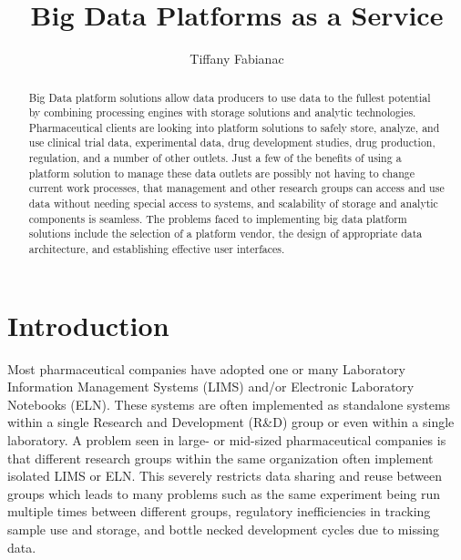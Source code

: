 \documentclass[sigconf]{acmart}
\begin{document}
\title{Big Data Platforms as a Service}


\author{Tiffany Fabianac}
\orcid{}

\renewcommand{\shortauthors}{T. Fabianac}


\begin{abstract}
Big Data platform solutions allow data producers to use data to the fullest potential by combining processing engines with storage solutions and analytic technologies. Pharmaceutical clients are looking into platform solutions to safely store, analyze, and use clinical trial data, experimental data, drug development studies, drug production, regulation, and a number of other outlets. Just a few of the benefits of using a platform solution to manage these data outlets are possibly not having to change current work processes, that management and other research groups can access and use data without needing special access to systems, and scalability of storage and analytic components is seamless. The problems faced to implementing big data platform solutions include the selection of a platform vendor, the design of appropriate data architecture, and establishing effective user interfaces.
\end{abstract}



\maketitle


\section{Introduction}
Most pharmaceutical companies have adopted one or many Laboratory Information Management Systems (LIMS) and/or Electronic Laboratory Notebooks (ELN). These systems are often implemented as standalone systems within a single Research and Development (R\&D) group or even within a single laboratory. A problem seen in large- or mid-sized pharmaceutical companies is that different research groups within the same organization often implement isolated LIMS or ELN. This severely restricts data sharing and reuse between groups which leads to many problems such as the same experiment being run multiple times between different groups, regulatory inefficiencies in tracking sample use and storage, and bottle necked development cycles due to missing data. 
\end{document}
